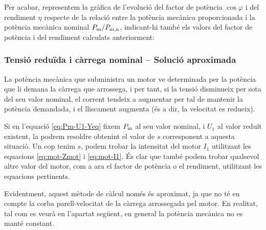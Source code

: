 \begin{exemple}
	Per acabar, representem  la gràfica de l'evolució del factor de potència $\cos\varphi$ i del rendiment $\eta$  respecte de la relació entre la potència mecànica proporcionada i la potència mecànica nominal $P_\mathrm{m}/P_\mathrm{m,n}$, indicant-hi també els valors del factor de potència i del rendiment calculats anteriorment:
	\begin{center}
		
	\end{center}

\end{exemple}
	
\subsubsection{Tensió reduïda i càrrega nominal -- Solució aproximada}

La potència mecànica que subministra un motor ve determinada per la potència que li demana la càrrega que arrossega, i per tant, si la tensió disminueix per sota del seu valor nominal, el corrent tendeix a augmentar per tal de mantenir la potència demandada, i el lliscament augmenta (és a dir, la velocitat es redueix).

Si en l'equació \eqref{eq:Pm-U1-Yeq} fixem $P_\mathrm{m}$ al seu valor nominal, i $U_1$ al valor reduït existent, la podrem resoldre obtenint el valor de $s$ corresponent  a aquesta situació. Un cop tenim $s$, podem trobar la intensitat del motor $I_1$ utilitzant les equacions \eqref{eq:mot-Zmot} i \eqref{eq:mot-I1}. És clar que també podem trobar qualsevol altre valor del motor, com a ara el factor de potència o el rendiment, utilitzant les equacions pertinents.

Evidentment, aquest mètode de càlcul només és aproximat, ja que no té en compte la corba parell-velocitat de la càrrega arrossegada pel motor. En realitat, tal com es veurà en l'apartat següent, en general la potència mecànica no es manté constant.

